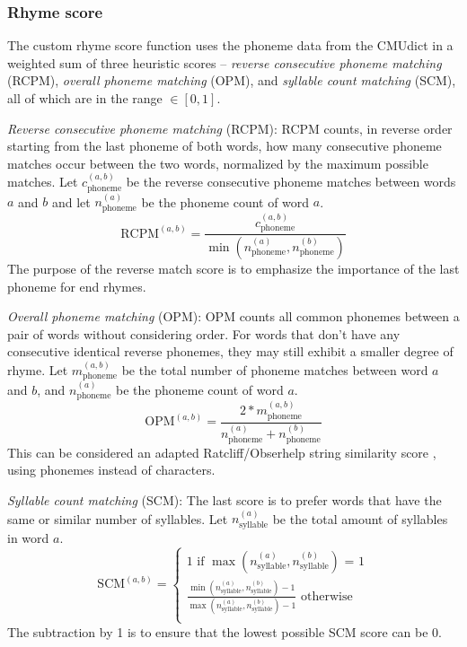 \documentclass[11pt,a4paper]{article}
\newenvironment{tight_itemize}{
\begin{itemize}
\setlength{\itemsep}{0pt}
\setlength{\parskip}{0pt}
}{\end{itemize}}
\begin{document}
\subsubsection{Rhyme score}
\label{sec:rhymescore}
The custom rhyme score function uses the phoneme data from the CMUdict in a weighted sum of three heuristic scores -- \textit{reverse consecutive phoneme matching} (RCPM), \textit{overall phoneme matching} (OPM), and \textit{syllable count matching} (SCM), all of which are in the range $\in [0, 1]$.
\begin{tight_itemize}
	\vspace{-0.5em}
	\item \textit{Reverse consecutive phoneme matching} (RCPM):
	RCPM counts, in reverse order starting from the last phoneme of both words, how many consecutive phoneme matches occur between the two words, normalized by the maximum possible matches. Let $c^{(a,b)}_{\text{phoneme}}$ be the reverse consecutive phoneme matches between words $a$ and $b$ and let $n^{(a)}_{\text{phoneme}}$ be the phoneme count of word $a$.
	$$\textrm{RCPM}^{(a,b)} = \frac{c^{(a,b)}_{\text{phoneme}}}{\min(n^{(a)}_{\text{phoneme}}, n^{(b)}_{\text{phoneme}})}$$
	The purpose of the reverse match score is to emphasize the importance of the last phoneme for end rhymes.
	\item \textit{Overall phoneme matching} (OPM):
		OPM counts all common phonemes between a pair of words without considering order. For words that don't have any consecutive identical reverse phonemes, they may still exhibit a smaller degree of rhyme. Let $m^{(a,b)}_{\text{phoneme}}$ be the total number of phoneme matches between word $a$ and $b$, and $n^{(a)}_{\text{phoneme}}$ be the phoneme count of word $a$.
		$$\textrm{OPM}^{(a,b)} = \frac{2 * m^{(a,b)}_{\text{phoneme}}}{n^{(a)}_{\text{phoneme}} + n^{(b)}_{\text{phoneme}}}$$
		This can be considered an adapted Ratcliff/Obserhelp string similarity score \cite{ratcliff}, using phonemes instead of characters.
	\item \textit{Syllable count matching} (SCM):
	The last score is to prefer words that have the same or similar number of syllables. Let $n^{(a)}_{\text{syllable}}$ be the total amount of syllables in word $a$.
	\begin{equation}
	\textrm{SCM}^{(a,b)} = 
	\begin{cases}
	\nonumber 1 \text{ if $\max(n^{(a)}_{\text{syllable}}, n^{(b)}_{\text{syllable}})$ = 1}\\
	\nonumber \frac{\min(n^{(a)}_{\text{syllable}}, n^{(b)}_{\text{syllable}}) - 1}{\max(n^{(a)}_{\text{syllable}}, n^{(b)}_{\text{syllable}}) - 1} \text{ otherwise}\\
        \end{cases}
	\end{equation}
	The subtraction by 1 is to ensure that the lowest possible SCM score can be 0.
\end{tight_itemize}
\end{document}
